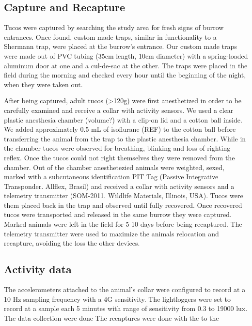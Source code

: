 \documentclass[msc,numbers,hidelinks]{coppe}
\begin{document}
  \hypertarget{capture-and-recapture}{%
  \subsection{Capture and Recapture}\label{capture-and-recapture}}

  Tucos were captured by searching the study area for fresh signs of burrow entrances. Once found, custom made traps, similar in functionality to a Shermann trap, were placed at the burrow's entrance. Our custom made traps were made out of PVC tubing (35cm length, 10cm diameter) with a spring-loaded aluminum door at one and a cul-de-sac at the other. The traps were placed in the field during the morning and checked every hour until the beginning of the night, when they were taken out.

  After being captured, adult tucos (\textgreater120g) were first anesthetized in order to be carefully examined and receive a collar with activity sensors. We used a clear plastic anesthesia chamber (volume?) with a clip-on lid and a cotton ball inside. We added approximately 0.5 mL of isoflurane (REF) to the cotton ball before transferring the animal from the trap to the plastic anesthesia chamber. While in the chamber tucos were observed for breathing, blinking and loss of righting reflex. Once the tucos could not right themselves they were removed from the chamber. Out of the chamber anesthetezied animals were weighted, sexed, marked with a subcutaneous identification PIT Tag (Passive Integrative Transponder. Allflex, Brasil) and received a collar with activity sensors and a telemetry transmitter (SOM-2011. Wildlife Materials, Illinois, USA). Tucos were them placed back in the trap and observed until fully recovered. Once recovered tucos were transported and released in the same burrow they were captured. Marked animals were left in the field for 5-10 days before being recaptured. The telemetry transmitter were used to maximize the animals relocation and recapture, avoiding the loss the other devices.

  \hypertarget{activity-data}{%
  \subsection{Activity data}\label{activity-data}}

  The accelerometers attached to the animal's collar were configured to record at a 10 Hz sampling frequency with a 4G sensitivity. The lightloggers were set to record at a sample each 5 minutes with range of sensitivity from 0.3 to 19000 lux.
  The data collection were done The recaptures were done with the to the
\end{document}
